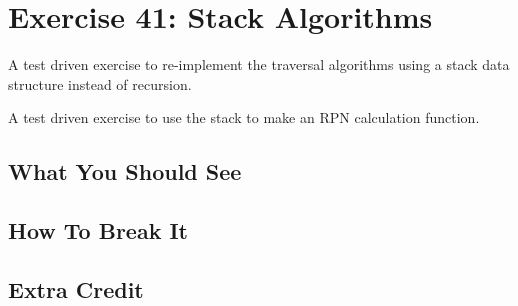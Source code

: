 \chapter{Exercise 41: Stack Algorithms}

A test driven exercise to re-implement the traversal algorithms using a stack data structure
instead of recursion.

A test driven exercise to use the stack to make an RPN calculation function.


\section{What You Should See}


\section{How To Break It}


\section{Extra Credit}



